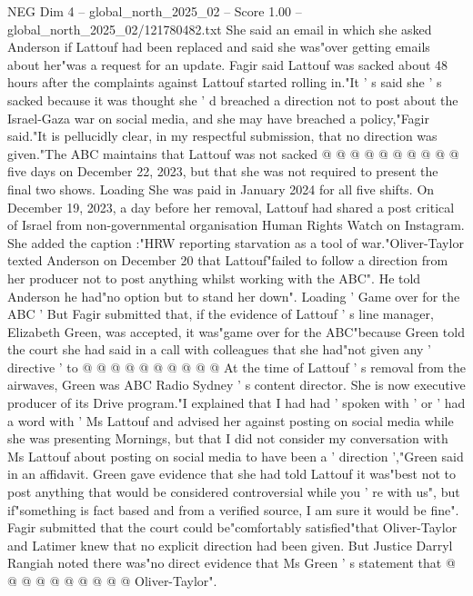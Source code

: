 \begin{textsample}{NEG Dim 4 – global\_north\_2025\_02 – Score 1.00 – global\_north\_2025\_02/121780482.txt}
She said an email in which she asked Anderson if Lattouf had been replaced and said she was"over getting emails about her"was a request for an update.
Fagir said Lattouf was sacked about 48 hours after the complaints against Lattouf started rolling in."It ' s said she ' s sacked because it was thought she ' d breached a direction not to post about the Israel-Gaza war on social media, and she may have breached a policy,"Fagir said."It is pellucidly clear, in my respectful submission, that no direction was given."The ABC maintains that Lattouf was not sacked @ @ @ @ @ @ @ @ @ @ five days on December 22, 2023, but that she was not required to present the final two shows.
Loading She was paid in January 2024 for all five shifts.
On December 19, 2023, a day before her removal, Lattouf had shared a post critical of Israel from non-governmental organisation Human Rights Watch on Instagram.
She added the caption :"HRW reporting starvation as a tool of war."Oliver-Taylor texted Anderson on December 20 that Lattouf"failed to follow a direction from her producer not to post anything whilst working with the ABC".
He told Anderson he had"no option but to stand her down".
Loading ' Game over for the ABC ' But Fagir submitted that, if the evidence of Lattouf ' s line manager, Elizabeth Green, was accepted, it was"game over for the ABC"because Green told the court she had said in a call with colleagues that she had"not given any ' directive ' to @ @ @ @ @ @ @ @ @ @ At the time of Lattouf ' s removal from the airwaves, Green was ABC Radio Sydney ' s content director.
She is now executive producer of its Drive program."I explained that I had had ' spoken with ' or ' had a word with ' Ms Lattouf and advised her against posting on social media while she was presenting Mornings, but that I did not consider my conversation with Ms Lattouf about posting on social media to have been a ' direction ',"Green said in an affidavit.
Green gave evidence that she had told Lattouf it was"best not to post anything that would be considered controversial while you ' re with us", but if"something is fact based and from a verified source, I am sure it would be fine".
Fagir submitted that the court could be"comfortably satisfied"that Oliver-Taylor and Latimer knew that no explicit direction had been given.
But Justice Darryl Rangiah noted there was"no direct evidence that Ms Green ' s statement that @ @ @ @ @ @ @ @ @ @ Oliver-Taylor".

\end{textsample}
